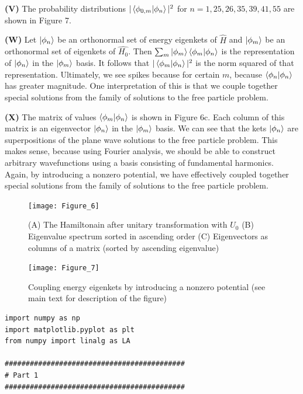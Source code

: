 \documentclass[12pt]{article}
\theoremstyle{definition}
\begin{document}
{\vspace{0.1in}
\noindent \textbf{(V)} The probability distributions $|\bra{\phi_{0,m}}\ket{\phi_{n}}|^{2}$ for $n=1, 25, 26, 35, 39, 41, 55$ are shown in Figure 7.

\vspace{0.1in}
\noindent \textbf{(W)} Let $\ket{\phi_{n}}$ be an orthonormal set of energy eigenkets of $\hat{H}$ and $\ket{\phi_{m}}$ be an orthonormal set of eigenkets of $\hat{H_{0}}$. Then $\sum_{m}\ket{\phi_{m}}\bra{\phi_{m}}\ket{\phi_{n}}$ is the representation of $\ket{\phi_{n}}$ in the $\ket{\phi_{m}}$ basis. It follows that $|\bra{\phi_{m}}\ket{\phi_{n}}|^{2}$ is the norm squared of that representation. Ultimately, we see spikes because for certain $m$, because $\bra{\phi_{n}}\ket{\phi_{n}}$ has greater magnitude. One interpretation of this is that we couple together special solutions from the family of solutions to the free particle problem.

\vspace{0.1in}
\noindent \textbf{(X)} The matrix of values $\bra{\phi_{m}}\ket{\phi_{n}}$ is shown in Figure 6c. Each column of this matrix is an eigenvector $\ket{\phi_{n}}$ in the $\ket{\phi_{m}}$ basis. We can see that the kets $\ket{\phi_{n}}$ are superpositions of the plane wave solutions to the free particle problem. This makes sense, because using Fourier analysis, we should be able to construct arbitrary wavefunctions using a basis consisting of fundamental harmonics. Again, by introducing a nonzero potential, we have effectively coupled together special solutions from the family of solutions to the free particle problem.


\begin{figure}[t!]
\centering
\texttt{[image: Figure\_6]}
\caption{(A) The Hamiltonain after unitary transformation with $U_{0}$ (B) Eigenvalue spectrum sorted in ascending order (C) Eigenvectors as columns of a matrix (sorted by ascending eigenvalue)}
\label{fig:method}
\end{figure}

\begin{figure}[t!]
\centering
\texttt{[image: Figure\_7]}
\caption{Coupling energy eigenkets by introducing a nonzero potential (see main text for description of the figure)}
\label{fig:method}
\end{figure}
\clearpage
\begin{lstlisting}
import numpy as np
import matplotlib.pyplot as plt
from numpy import linalg as LA

###########################################
# Part 1
###########################################


\end{lstlisting}}
\end{document}
